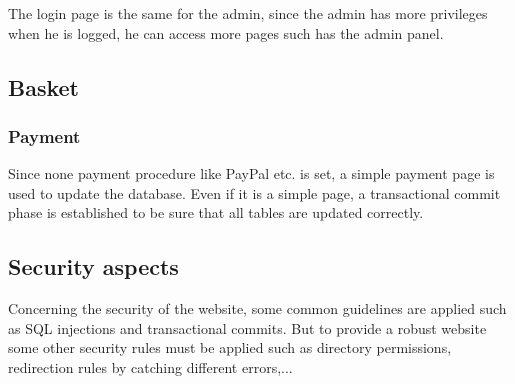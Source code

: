 \documentclass{article}
\begin{document}
The login page is the same for the admin, since the admin has more privileges when he is logged, he can access more pages such has the admin panel.

\subsection{Basket}

\subsubsection{Payment}
Since none payment procedure like PayPal etc. is set, a simple payment page is used to update the database. Even if it is a simple page, a transactional commit phase is established to be sure that all tables are updated correctly.

\subsection{Security aspects}
Concerning the security of the website, some common guidelines are applied such as SQL injections and transactional commits. But to provide a robust website some other security rules must be applied such as directory permissions, redirection rules by catching different errors,... 
\end{document}
